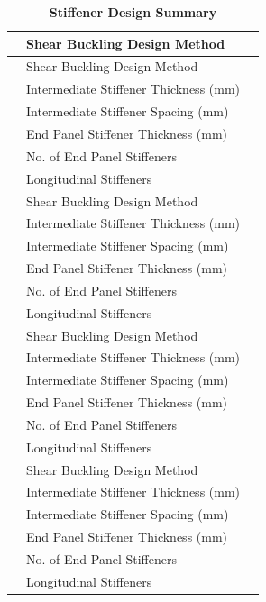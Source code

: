 \documentclass[12pt,a4paper]{report}
\numberwithin{table}{chapter}
\numberwithin{figure}{chapter}
\begin{document}
\vspace{1em}
\begin{longtable}{|C{2.5cm}|L{6.5cm}|>{\arraybackslash}p{6.5cm}|}
\caption{\textbf{Stiffener Design Summary}}
\hline
{} & \textnormal{Shear Buckling Design Method} &  \\[6pt]
\endfirsthead
\hline
{} & \textnormal{Shear Buckling Design Method} &  \\[6pt]
\endhead
{}
 & \textnormal{Intermediate Stiffener Thickness (mm)} &  \\[6pt]
 & \textnormal{Intermediate Stiffener Spacing (mm)} &  \\[6pt]
 & \textnormal{End Panel Stiffener Thickness (mm)} &  \\[6pt]
 & \textnormal{No. of End Panel Stiffeners} &  \\[6pt]
 & \textnormal{Longitudinal Stiffeners} &  \\[6pt]
\hline
{} & \textnormal{Shear Buckling Design Method} &  \\[6pt]
 & \textnormal{Intermediate Stiffener Thickness (mm)} &  \\[6pt]
 & \textnormal{Intermediate Stiffener Spacing (mm)} &  \\[6pt]
 & \textnormal{End Panel Stiffener Thickness (mm)} &  \\[6pt]
 & \textnormal{No. of End Panel Stiffeners} &  \\[6pt]
 & \textnormal{Longitudinal Stiffeners} &  \\[6pt]
\hline
{} & \textnormal{Shear Buckling Design Method} &  \\[6pt]
 & \textnormal{Intermediate Stiffener Thickness (mm)} &  \\[6pt]
 & \textnormal{Intermediate Stiffener Spacing (mm)} &  \\[6pt]
 & \textnormal{End Panel Stiffener Thickness (mm)} &  \\[6pt]
 & \textnormal{No. of End Panel Stiffeners} &  \\[6pt]
 & \textnormal{Longitudinal Stiffeners} &  \\[6pt]
\hline
{} & \textnormal{Shear Buckling Design Method} &  \\[6pt]
 & \textnormal{Intermediate Stiffener Thickness (mm)} &  \\[6pt]
 & \textnormal{Intermediate Stiffener Spacing (mm)} &  \\[6pt]
 & \textnormal{End Panel Stiffener Thickness (mm)} &  \\[6pt]
 & \textnormal{No. of End Panel Stiffeners} &  \\[6pt]
 & \textnormal{Longitudinal Stiffeners} &  \\[6pt]
\hline
\end{longtable}
\end{document}
